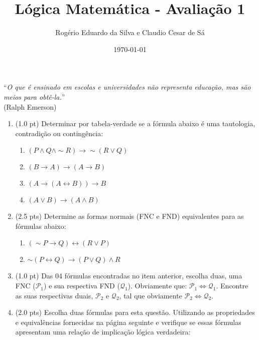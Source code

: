 \documentclass[12pt]{article}
\title{Lógica Matemática - Avaliação 1}
\author{Rogério Eduardo da Silva e Claudio Cesar de Sá}
\date{\today}
\begin{document}
\maketitle

\begin{flushright}
``\textit{O que é ensinado em escolas e universidades não representa educação, mas são meios para obtê-la.}''\\ (Ralph Emerson)
\end{flushright}

\begin{enumerate}

\item (1.0 pt) Determinar por tabela-verdade se a fórmula abaixo é uma tautologia, contradição ou contingência: 

\begin{enumerate}
\setlength{\itemsep}{-2pt}
\item $(P \wedge Q \wedge \sim R) \rightarrow \sim (R \vee Q)$

\item $(B \rightarrow A) \rightarrow (A \rightarrow  B)$

\item $(A \rightarrow (A \leftrightarrow  B)) \rightarrow  B $
\item $(A \vee B)\rightarrow (A \wedge  B)$
\end{enumerate}


\item (2.5 pts) Determine as formas normais (FNC e FND) equivalentes para as fórmulas abaixo: 
\begin{enumerate}
\setlength{\itemsep}{-5pt}

\item $(\sim P\rightarrow Q)\leftrightarrow (R \vee P)$
\item $\sim(P\leftrightarrow Q)\rightarrow (P\vee Q)\wedge R$
\end{enumerate}



\item (1.0 pt) Das 04 fórmulas
encontradas no item anterior, escolha duas, uma 
FNC ($\mathcal{P}_1$) e sua respectiva FND ($\mathcal{Q}_1$). Obviamente que: $\mathcal{P}_1 \Leftrightarrow \mathcal{Q}_1$. Encontre as suas respectivas duais,
$\mathcal{P}_2$ e $\mathcal{Q}_2$,  tal que obviamente 
$\mathcal{P}_2 \Leftrightarrow \mathcal{Q}_2$.


\item (2.0 pts) Escolha duas fórmulas para esta questão.
Utilizando as propriedades e equivalências
fornecidas na página seguinte
e verifique  se essas fórmulas apresentam uma relaç\~ao de implicaç\~ao lógica  verdadeira:


\end{enumerate}
\end{document}
